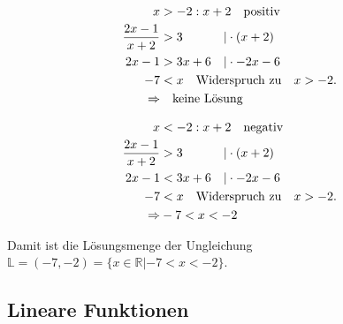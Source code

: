 \begin{minipage}{0.45\textwidth}
    \begin{align*}
        x &> -2: x+2 \qq{positiv}\\
        \frac{2x-1}{x+2} &> 3\hphantom{x+6} \quad |\cdot (x+2) \\
        2x-1 &> 3x+6  \quad |\cdot -2x-6 \\
        -7 &< x   \qq{Widerspruch zu} x > -2. \\
        \Rightarrow & \qq{keine Lösung}
    \end{align*}
\end{minipage}
\hfill\vline\hfill
\begin{minipage}{0.45\textwidth}
    \begin{align*}
        x &< -2: x+2 \qq{negativ}\\
        \frac{2x-1}{x+2} &> 3\hphantom{x+6} \quad |\cdot (x+2) \\
        2x-1 &< 3x+6  \quad |\cdot -2x-6 \\
        -7 &< x   \qq{Widerspruch zu} x > -2. \\
        \Rightarrow & -7 < x < -2
    \end{align*}
\end{minipage}

Damit ist die Lösungsmenge der Ungleichung $\mathbb{L} = (-7,-2) = \{x\in \mathbb{R}|-7 < x<-2\}$.

\subsection{Lineare Funktionen} 

